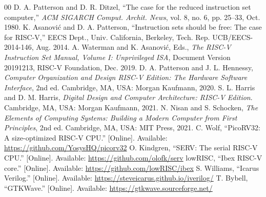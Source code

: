 \documentclass[conference]{IEEEtran}
\begin{document}
\begin{thebibliography}{00}
 D. A. Patterson and D. R. Ditzel, ``The case for the
reduced instruction set computer,'' \emph{ACM SIGARCH Comput. Archit. News},
vol. 8, no. 6, pp. 25--33, Oct. 1980.
 K. Asanovi\'c and D. A. Patterson, ``Instruction sets
should be free: The case for RISC-V,'' EECS Dept., Univ. California, Berkeley,
Tech. Rep. UCB/EECS-2014-146, Aug. 2014.
 A. Waterman and K. Asanovi\'c, Eds., \emph{The RISC-V
Instruction Set Manual, Volume I: Unprivileged ISA}, Document Version
20191213, RISC-V Foundation, Dec. 2019.
 D. A. Patterson and J. L. Hennessy, \emph{Computer
Organization and Design RISC-V Edition: The Hardware Software Interface},
2nd ed. Cambridge, MA, USA: Morgan Kaufmann, 2020.
 S. L. Harris and D. M. Harris, \emph{Digital Design and
Computer Architecture: RISC-V Edition}. Cambridge, MA, USA: Morgan Kaufmann,
2021.
 N. Nisan and S. Schocken, \emph{The Elements of Computing
Systems: Building a Modern Computer from First Principles}, 2nd ed.
Cambridge, MA, USA: MIT Press, 2021.
 C. Wolf, ``PicoRV32: A size-optimized RISC-V CPU.''
[Online]. Available: \url{https://github.com/YosysHQ/picorv32}
 O. Kindgren, ``SERV: The serial RISC-V CPU.'' [Online].
Available: \url{https://github.com/olofk/serv}
 lowRISC, ``Ibex RISC-V core.'' [Online]. Available:
\url{https://github.com/lowRISC/ibex}
 S. Williams, ``Icarus Verilog.'' [Online]. Available:
\url{https://steveicarus.github.io/iverilog/}
 T. Bybell, ``GTKWave.'' [Online]. Available:
\url{https://gtkwave.sourceforge.net/}
\end{thebibliography}
\end{document}
